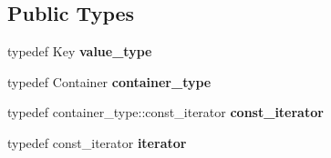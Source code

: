\subsection*{Public Types}
\begin{DoxyCompactItemize}
\item 
\mbox{\label{structcugar_1_1priority__queue_a76d40fc86f92d59d868f9ae8751f9e01}} 
typedef Key {\bfseries value\+\_\+type}
\item 
\mbox{\label{structcugar_1_1priority__queue_a9b33573c1416545cf54280341c8598c4}} 
typedef Container {\bfseries container\+\_\+type}
\item 
\mbox{\label{structcugar_1_1priority__queue_a7657dda28e85b50f5e9d4b64e71f44a9}} 
typedef container\+\_\+type\+::const\+\_\+iterator {\bfseries const\+\_\+iterator}
\item 
\mbox{\label{structcugar_1_1priority__queue_a9b22c2c55291745163c5944e5e79b0b5}} 
typedef const\+\_\+iterator {\bfseries iterator}
\end{DoxyCompactItemize}
